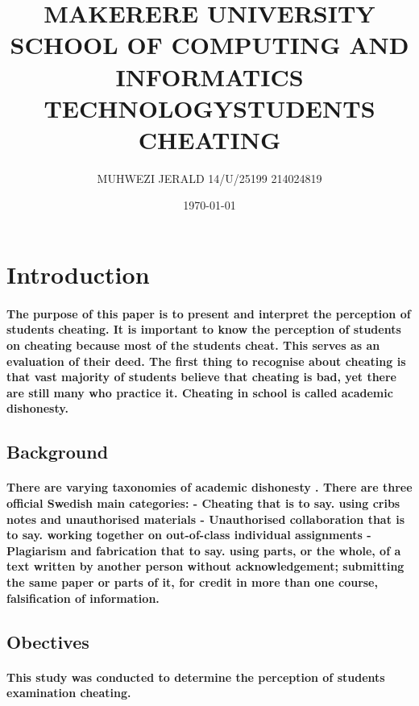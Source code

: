 \documentclass{article}
\begin{document}
		
\title{MAKERERE UNIVERSITY SCHOOL OF COMPUTING AND INFORMATICS TECHNOLOGY}
\author{MUHWEZI JERALD 14/U/25199 214024819}
\date{\today{}}
	\maketitle
	
	\newpage
	\title{STUDENTS CHEATING}
	\tableofcontents
	
	\section{Introduction}
	 \paragraph{The purpose of this paper is to present and
	  interpret the perception of students cheating. It is important to know the perception of students on cheating because most of the students cheat. This serves as an evaluation of their deed. The first thing to recognise about cheating is that vast majority of students believe that cheating is bad, yet there are still many who practice it. Cheating in school is called academic dishonesty.}
	 
	 \subsection{Background}
	 \paragraph{There are varying  taxonomies of academic dishonesty \cite{DUMMY:2}. There are three official Swedish main categories: - Cheating that is to say. using cribs notes and unauthorised materials - Unauthorised collaboration that is to say. working together on out-of-class individual assignments - Plagiarism and fabrication that to say. using parts, or the whole, of a text written by another person without acknowledgement; submitting the same paper or parts of it, for credit in more than one course, falsification of information.}
	 
	 \subsection{Obectives}
	   \paragraph{This study was conducted to determine the perception of students examination cheating.}
	   
\end{document}
